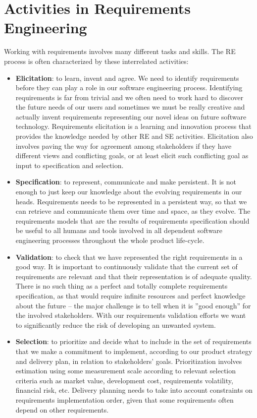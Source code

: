\newpage
\section{Activities in Requirements Engineering}%
\MarginPage{}%
%
Working with requirements involves many different tasks and skills. The RE process is often characterized by these interrelated activities: 

\begin{itemize}
  \item \textbf{Elicitation}: to learn, invent and agree. We need to identify requirements before they can play a role in our software engineering process. Identifying requirements is far from trivial and we often need to work hard to discover the future needs of our users and sometimes we must be really creative and actually invent requirements representing our novel ideas on future software technology. Requirements elicitation is a learning and innovation process that provides the knowledge needed by other RE and SE activities. Elicitation also involves paving the way for agreement among stakeholders  if they have different views and conflicting goals, or at least elicit such conflicting goal as input to specification and selection.
  \item \textbf{Specification}: to represent, communicate and make persistent. It is not enough to just keep our knowledge about the evolving requirements in our heads. Requirements needs to be represented in a persistent way, so that we can retrieve and communicate them over time and space, as they evolve. The requirements models that are the results of requirements specification should be useful to all humans and tools involved in all dependent software engineering processes throughout the whole product life-cycle.
  \item \textbf{Validation}: to check that we have represented the right requirements in a good way. It is important to continuously validate that the current set of requirements are relevant and that their representation is of adequate quality. There is no such thing as a perfect and totally complete requirements specification, as that would require infinite resources and perfect knowledge about the future -- the major challenge is to tell when it is ''good enough'' for the involved stakeholders. With our requirements validation efforts we want to significantly reduce the risk of developing an unwanted system.
  \item \textbf{Selection}: to prioritize and decide what to include in the set of requirements that we make a commitment to implement, according to our product strategy and delivery plan, in relation to stakeholders' goals. Prioritization involves estimation using some measurement scale according to relevant selection criteria such as market value, development cost, requirements volatility, financial risk, etc. Delivery planning needs to take into account constraints on requirements implementation order, given that some requirements often depend on other requirements. 
\end{itemize}

